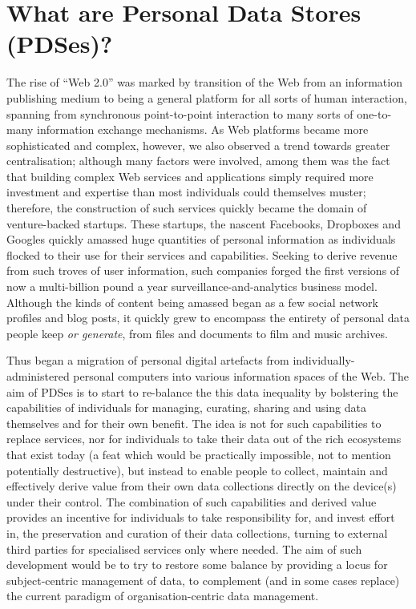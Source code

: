\documentclass{acm_proc_article-sp}
\begin{document}
\section{What are Personal Data Stores (PDSes)?}

The rise of ``Web 2.0'' was marked by transition of the Web from an information publishing medium to being a general platform for all sorts of human interaction, spanning from synchronous point-to-point interaction to many sorts of one-to-many information exchange mechanisms. As Web platforms became more sophisticated and complex, however, we also observed a trend towards greater centralisation; although many factors were involved, among them was the fact that building complex Web services and applications simply required more investment and expertise than most individuals could themselves muster; therefore, the construction of such services quickly became the domain of venture-backed startups. These startups, the nascent Facebooks, Dropboxes and Googles quickly amassed huge quantities of personal information as individuals flocked to their use for their services and capabilities. Seeking to derive revenue from such troves of user information, such companies forged the first versions of now a multi-billion pound a year surveillance-and-analytics business model. Although the kinds of content being amassed began as a few social network profiles and blog posts, it quickly grew to encompass the entirety of personal data people keep {\em or generate}, from files and documents to film and music archives. 

Thus began a migration of personal digital artefacts from individually-administered personal computers into various information spaces of the Web. The aim of PDSes is to start to re-balance the this data inequality by bolstering the capabilities of individuals for managing, curating, sharing and using data themselves and for their own benefit. The idea is not for such capabilities to replace services, nor for individuals to take their data out of the rich ecosystems that exist today (a feat which would be practically impossible, not to mention potentially destructive), but instead to enable people to collect, maintain and effectively derive value from their own data collections directly on the device(s) under their control. The combination of such capabilities and derived value provides an incentive for individuals to take responsibility for, and invest effort in, the preservation and curation of their data collections, turning to external third parties for specialised services only where needed. The aim of such development would be to try to restore some balance by providing a locus for subject-centric management of data, to complement (and in some cases replace) the current paradigm of organisation-centric data management.
\end{document}
